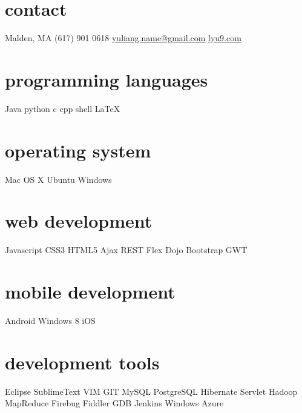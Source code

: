 \documentclass[]{ly-cv} %
\begin{document}
\begin{aside} %
\section{contact}
Malden, MA
(617) 901 0618
\href{mailto:yuliang.name@gmail.com}{yuliang.name@gmail.com}
\href{http://lyu9.com}{lyu9.com}
\section{programming languages}
Java python c cpp 
shell \LaTeX
\section{operating system}
Mac OS X Ubuntu Windows
\section{web development}
Javascript CSS3 HTML5 
Ajax REST Flex Dojo 
Bootstrap GWT
\section{mobile development}
Android Windows 8 iOS
\section{development tools}
Eclipse SublimeText VIM
GIT MySQL PostgreSQL
Hibernate Servlet 
Hadoop MapReduce 
Firebug Fiddler GDB
Jenkins Windows Azure
\end{aside}
\end{document}
